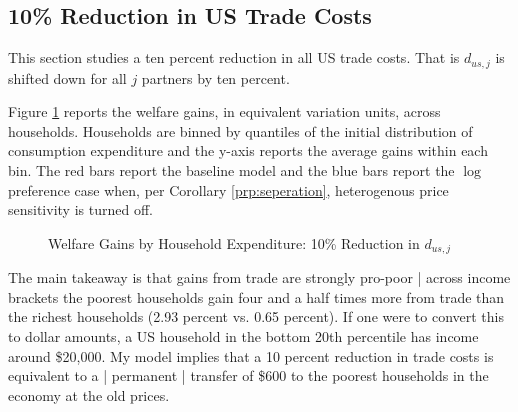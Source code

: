 \documentclass[12pt,pdftex]{article}
\begin{document}
\begin{onehalfspacing}
\subsection{10\% Reduction in US Trade Costs}

This section studies a ten percent reduction in all US trade costs. That is $d_{us,j}$ is shifted down for all $j$ partners by ten percent.

Figure \ref{fig:welfare-households} reports the welfare gains, in equivalent variation units, across households. Households are binned by quantiles of the initial distribution of consumption expenditure and the y-axis reports the average gains within each bin. The red bars report the baseline model and the blue bars report the $\log$ preference case when, per Corollary \ref{prp:seperation}, heterogenous price sensitivity is turned off.

\begin{figure}[!t]
\caption{Welfare Gains by Household Expenditure: 10\% Reduction in $d_{us,j}$ }\label{fig:welfare-households}
\end{figure}

The main takeaway is that gains from trade are strongly pro-poor | across income brackets the poorest households gain four and a half times more from trade than the richest households (2.93 percent vs. 0.65 percent). If one were to convert this to dollar amounts, a US household in the bottom 20th percentile has income around \$20,000. My model implies that a 10 percent reduction in trade costs is equivalent to a | permanent | transfer of \$600 to the poorest households in the economy at the old prices.


\end{onehalfspacing}
\end{document}
